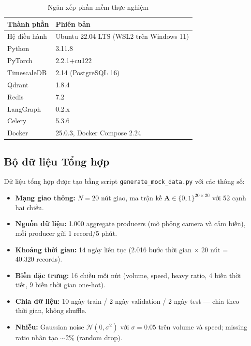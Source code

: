 \begin{table}[H]
\centering
\caption{Ngăn xếp phần mềm thực nghiệm}
\label{tab:sw_env}
\renewcommand{\arraystretch}{1.4}
\begin{tabular}{p{3.5cm} p{9cm}}
\toprule
\textbf{Thành phần} & \textbf{Phiên bản} \\
\midrule
Hệ điều hành & Ubuntu 22.04 LTS (WSL2 trên Windows 11) \\
\rowcolor{rowgray}
Python & 3.11.8 \\
PyTorch & 2.2.1+cu122 \\
\rowcolor{rowgray}
TimescaleDB & 2.14 (PostgreSQL 16) \\
Qdrant & 1.8.4 \\
\rowcolor{rowgray}
Redis & 7.2 \\
LangGraph & 0.2.x \\
\rowcolor{rowgray}
Celery & 5.3.6 \\
Docker & 25.0.3, Docker Compose 2.24 \\
\bottomrule
\end{tabular}
\end{table}

\subsection{Bộ dữ liệu Tổng hợp}

Dữ liệu tổng hợp được tạo bằng script \texttt{generate\_mock\_data.py} với các thông số:

\begin{itemize}[itemsep=3pt]
  \item \textbf{Mạng giao thông:} $N = 20$ nút giao, ma trận kề $\mathbf{A} \in \{0,1\}^{20 \times 20}$ với 52 cạnh hai chiều.
  \item \textbf{Nguồn dữ liệu:} 1.000 aggregate producers (mô phỏng camera và cảm biến), mỗi producer gửi 1 record/5 phút.
  \item \textbf{Khoảng thời gian:} 14 ngày liên tục (2.016 bước thời gian $\times$ 20 nút = 40.320 records).
  \item \textbf{Biến đặc trưng:} 16 chiều mỗi nút (volume, speed, heavy ratio, 4 biến thời tiết, 9 biến thời gian one-hot).
  \item \textbf{Chia dữ liệu:} 10 ngày train / 2 ngày validation / 2 ngày test --- chia theo thời gian, không shuffle.
  \item \textbf{Nhiễu:} Gaussian noise $\mathcal{N}(0, \sigma^2)$ với $\sigma = 0.05$ trên volume và speed; missing ratio nhân tạo $\sim$2\% (random drop).
\end{itemize}

